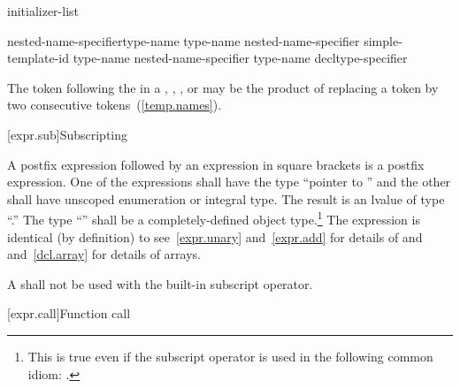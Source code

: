 \begin{bnf}
\br
    initializer-list
\end{bnf}


\begin{bnf}
\br
    nested-name-specifier\opt type-name \terminal{::\,\tilde} type-name\br
    nested-name-specifier  simple-template-id \terminal{::\,\tilde} type-name\br
    nested-name-specifier\opt \terminal{\tilde} type-name\br
    \terminal{\tilde} decltype-specifier
\end{bnf}

\pnum
\enternote The \tcode{>} token following the
 in a ,
, , or
 may be the product of replacing a
\tcode{>{>}} token by two consecutive \tcode{>}
tokens~(\ref{temp.names}).\exitnote

[expr.sub]{Subscripting}

\pnum
{}%
%
A postfix expression followed by an expression in square brackets is a
postfix expression. One of the expressions shall have the type ``pointer
to '' and the other shall have unscoped enumeration or integral type.
The result is an lvalue of type ``.''
%
The type ``'' shall be a completely-defined object type.\footnote{This
is true even if the subscript operator is used in the following common idiom:
.}
The expression  is identical (by definition) to
\enternote 
see~\ref{expr.unary} and~\ref{expr.add} for details of \tcode{*} and
\tcode{+} and~\ref{dcl.array} for details of arrays.
\exitnote 

\pnum
A  shall not be used with the built-in subscript operator.

[expr.call]{Function call}

